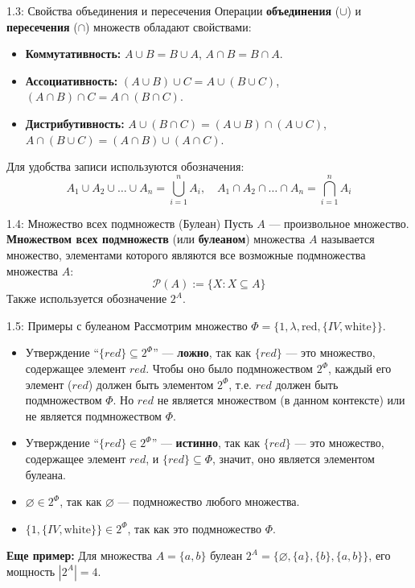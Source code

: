 \documentclass[a4paper,12pt]{article}
\begin{document}
\begin{propertybox}{1.3: Свойства объединения и пересечения}
	Операции \textbf{объединения} ($\cup$) и \textbf{пересечения} ($\cap$) множеств обладают свойствами:
	\begin{itemize}
		\item \textbf{Коммутативность:} $A \cup B = B \cup A$, $A \cap B = B \cap A$.
		\item \textbf{Ассоциативность:} $(A \cup B) \cup C = A \cup (B \cup C)$, $(A \cap B) \cap C = A \cap (B \cap C)$.
		\item \textbf{Дистрибутивность:} $A \cup (B \cap C) = (A \cup B) \cap (A \cup C)$, $A \cap (B \cup C) = (A \cap B) \cup (A \cap C)$.
	\end{itemize}
\end{propertybox}

\noindent Для удобства записи используются обозначения:
\[
A_1 \cup A_2 \cup \dots \cup A_n = \bigcup_{i=1}^{n} A_i, \quad A_1 \cap A_2 \cap \dots \cap A_n = \bigcap_{i=1}^{n} A_i
\]

\begin{definitionbox}{1.4: Множество всех подмножеств (Булеан)}
	Пусть $A$ — произвольное множество. \textbf{Множеством всех подмножеств} (или \textbf{булеаном}) множества $A$ называется множество, элементами которого являются все возможные подмножества множества $A$:
	\[ \mathcal{P}(A) := \{ X : X \subseteq A \} \]
	Также используется обозначение $2^A$.
\end{definitionbox}

\begin{examplebox}{1.5: Примеры с булеаном}
	Рассмотрим множество $\Phi = \{1, \lambda, \text{red}, \{IV, \text{white}\}\}$.
	\begin{itemize}
		\item Утверждение ``$\{red\} \subseteq 2^\Phi$'' — \textbf{ложно}, так как $\{red\}$ — это множество, содержащее элемент $red$. Чтобы оно было подмножеством $2^\Phi$, каждый его элемент ($red$) должен быть элементом $2^\Phi$, т.е. $red$ должен быть подмножеством $\Phi$. Но $red$ не является множеством (в данном контексте) или не является подмножеством $\Phi$.
		\item Утверждение ``$\{red\} \in 2^\Phi$'' — \textbf{истинно}, так как $\{red\}$ — это множество, содержащее элемент $red$, и $\{red\} \subseteq \Phi$, значит, оно является элементом булеана.
		\item $\varnothing \in 2^\Phi$, так как $\varnothing$ — подмножество любого множества.
		\item $\{1, \{IV, \text{white}\}\} \in 2^\Phi$, так как это подмножество $\Phi$.
	\end{itemize}
	\textbf{Еще пример:} Для множества $A = \{a, b\}$ булеан $2^A = \{\varnothing, \{a\}, \{b\}, \{a, b\}\}$, его мощность $|2^A| = 4$.
\end{examplebox}
\end{document}
